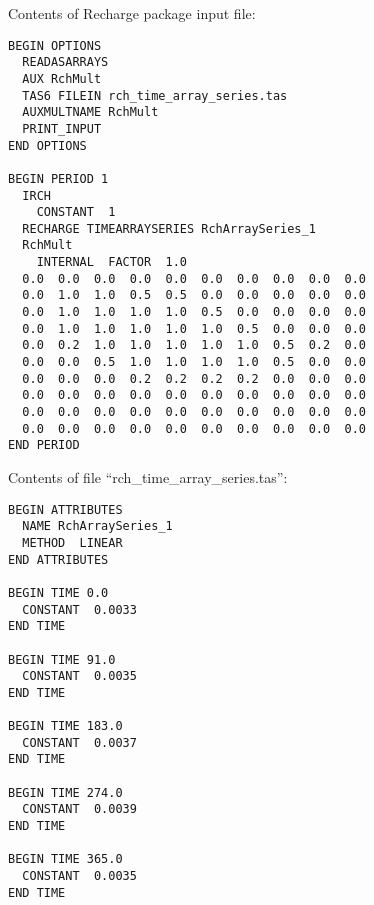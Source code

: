 \vspace{5 mm}

Contents of Recharge package input file:

\begin{lstlisting}[style=inputfile]
BEGIN OPTIONS
  READASARRAYS
  AUX RchMult 
  TAS6 FILEIN rch_time_array_series.tas
  AUXMULTNAME RchMult
  PRINT_INPUT
END OPTIONS

BEGIN PERIOD 1
  IRCH
    CONSTANT  1
  RECHARGE TIMEARRAYSERIES RchArraySeries_1
  RchMult
    INTERNAL  FACTOR  1.0
  0.0  0.0  0.0  0.0  0.0  0.0  0.0  0.0  0.0  0.0
  0.0  1.0  1.0  0.5  0.5  0.0  0.0  0.0  0.0  0.0
  0.0  1.0  1.0  1.0  1.0  0.5  0.0  0.0  0.0  0.0
  0.0  1.0  1.0  1.0  1.0  1.0  0.5  0.0  0.0  0.0
  0.0  0.2  1.0  1.0  1.0  1.0  1.0  0.5  0.2  0.0
  0.0  0.0  0.5  1.0  1.0  1.0  1.0  0.5  0.0  0.0
  0.0  0.0  0.0  0.2  0.2  0.2  0.2  0.0  0.0  0.0
  0.0  0.0  0.0  0.0  0.0  0.0  0.0  0.0  0.0  0.0
  0.0  0.0  0.0  0.0  0.0  0.0  0.0  0.0  0.0  0.0
  0.0  0.0  0.0  0.0  0.0  0.0  0.0  0.0  0.0  0.0
END PERIOD
\end{lstlisting}

Contents of file ``rch\_time\_array\_series.tas'':

\begin{lstlisting}[style=inputfile]
BEGIN ATTRIBUTES
  NAME RchArraySeries_1
  METHOD  LINEAR
END ATTRIBUTES

BEGIN TIME 0.0
  CONSTANT  0.0033
END TIME

BEGIN TIME 91.0
  CONSTANT  0.0035
END TIME

BEGIN TIME 183.0
  CONSTANT  0.0037
END TIME

BEGIN TIME 274.0
  CONSTANT  0.0039
END TIME

BEGIN TIME 365.0
  CONSTANT  0.0035
END TIME
\end{lstlisting}



